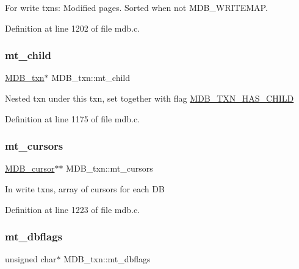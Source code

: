 For write txns\+: Modified pages. Sorted when not M\+D\+B\+\_\+\+W\+R\+I\+T\+E\+M\+AP. 

Definition at line 1202 of file mdb.\+c.

\mbox{\label{struct_m_d_b__txn_a58c028bf009e3968696ba65d41f6aa81}} 
\subsubsection{\texorpdfstring{mt\+\_\+child}{mt\_child}}
{\footnotesize\ttfamily \mbox{\hyperlink{struct_m_d_b__txn}{M\+D\+B\+\_\+txn}}$\ast$ M\+D\+B\+\_\+txn\+::mt\+\_\+child}

Nested txn under this txn, set together with flag \mbox{\hyperlink{group__mdb__txn_gae22c21354cea3cf2bddba79348c8f5b8}{M\+D\+B\+\_\+\+T\+X\+N\+\_\+\+H\+A\+S\+\_\+\+C\+H\+I\+LD}} 

Definition at line 1175 of file mdb.\+c.

\mbox{\label{struct_m_d_b__txn_aa8a8241adc1169c76b95498432540ce7}} 
\subsubsection{\texorpdfstring{mt\+\_\+cursors}{mt\_cursors}}
{\footnotesize\ttfamily \mbox{\hyperlink{struct_m_d_b__cursor}{M\+D\+B\+\_\+cursor}}$\ast$$\ast$ M\+D\+B\+\_\+txn\+::mt\+\_\+cursors}

In write txns, array of cursors for each DB 

Definition at line 1223 of file mdb.\+c.

\mbox{\label{struct_m_d_b__txn_a484dbc29f7f03b58676463d65cb628f1}} 
\subsubsection{\texorpdfstring{mt\+\_\+dbflags}{mt\_dbflags}}
{\footnotesize\ttfamily unsigned char$\ast$ M\+D\+B\+\_\+txn\+::mt\+\_\+dbflags}


